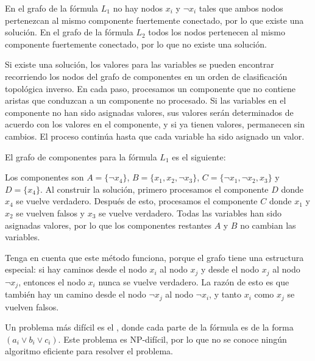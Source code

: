 En el grafo de la fórmula $L_1$
no hay nodos $x_i$ y $\lnot x_i$
tales que ambos nodos
pertenezcan al mismo componente fuertemente conectado,
por lo que existe una solución.
En el grafo de la fórmula $L_2$
todos los nodos pertenecen al mismo componente fuertemente conectado,
por lo que no existe una solución.

Si existe una solución, los valores para las variables
se pueden encontrar recorriendo los nodos del
grafo de componentes en un orden de clasificación topológica inverso.
En cada paso, procesamos un componente 
que no contiene aristas que conduzcan a un
componente no procesado.
Si las variables en el componente
no han sido asignadas valores,
sus valores serán determinados
de acuerdo con los valores en el componente,
y si ya tienen valores,
permanecen sin cambios.
El proceso continúa hasta que cada variable
ha sido asignado un valor.

El grafo de componentes para la fórmula $L_1$ es el siguiente:
\begin{center}
\end{center}

Los componentes son
$A = \{\lnot x_4\}$,
$B = \{x_1, x_2, \lnot x_3\}$,
$C = \{\lnot x_1, \lnot x_2, x_3\}$ y
$D = \{x_4\}$.
Al construir la solución,
primero procesamos el componente $D$
donde $x_4$ se vuelve verdadero.
Después de esto, procesamos el componente $C$
donde $x_1$ y $x_2$ se vuelven falsos
y $x_3$ se vuelve verdadero.
Todas las variables han sido asignadas valores,
por lo que los componentes restantes $A$ y $B$
no cambian las variables.

Tenga en cuenta que este método funciona, porque el
grafo tiene una estructura especial:
si hay caminos desde el nodo $x_i$ al nodo $x_j$
y desde el nodo $x_j$ al nodo $\lnot x_j$,
entonces el nodo $x_i$ nunca se vuelve verdadero.
La razón de esto es que también hay
un camino desde el nodo $\lnot x_j$ al nodo $\lnot x_i$,
y tanto $x_i$ como $x_j$ se vuelven falsos.


Un problema más difícil es el ,
donde cada parte de la fórmula es de la forma
$(a_i \lor b_i \lor c_i)$.
Este problema es NP-difícil, por lo que no se conoce ningún algoritmo eficiente
para resolver el problema.
